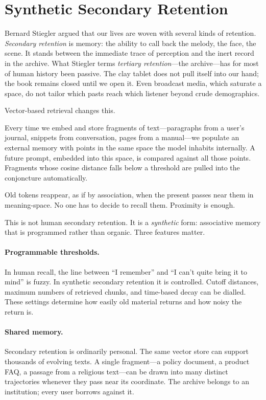 \documentclass[12pt,a4paper]{article}
\begin{document}
\section{Synthetic Secondary Retention}

Bernard Stiegler argued that our lives are woven with several kinds of retention.\cite{stiegler1998technics} \emph{Secondary retention} is memory: the ability to call back the melody, the face, the scene. It stands between the immediate trace of perception and the inert record in the archive. What Stiegler terms \emph{tertiary retention}---the archive---has for most of human history been passive. The clay tablet does not pull itself into our hand; the book remains closed until we open it. Even broadcast media, which saturate a space, do not tailor which pasts reach which listener beyond crude demographics.

Vector-based retrieval changes this.

Every time we embed and store fragments of text---paragraphs from a user's journal, snippets from conversation, pages from a manual---we populate an external memory with points in the same space the model inhabits internally. A future prompt, embedded into this space, is compared against all those points. Fragments whose cosine distance falls below a threshold are pulled into the conjoncture automatically.

Old tokens reappear, as if by association, when the present passes near them in meaning-space. No one has to decide to recall them. Proximity is enough.

This is not human secondary retention. It is a \emph{synthetic} form: associative memory that is programmed rather than organic. Three features matter.

\paragraph{Programmable thresholds.} In human recall, the line between ``I remember'' and ``I can't quite bring it to mind'' is fuzzy. In synthetic secondary retention it is controlled. Cutoff distances, maximum numbers of retrieved chunks, and time-based decay can be dialled. These settings determine how easily old material returns and how noisy the return is.

\paragraph{Shared memory.} Secondary retention is ordinarily personal. The same vector store can support thousands of evolving texts. A single fragment---a policy document, a product FAQ, a passage from a religious text---can be drawn into many distinct trajectories whenever they pass near its coordinate. The archive belongs to an institution; every user borrows against it.
\end{document}
